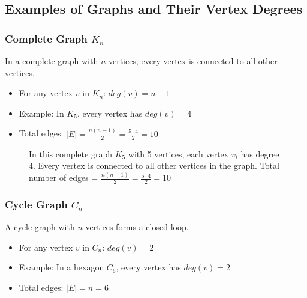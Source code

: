 \documentclass{article}
\theoremstyle{definition}
\def\deg{deg}%
\begin{document}
\subsection{Examples of Graphs and Their Vertex Degrees}

\subsubsection{Complete Graph $K_n$}
In a complete graph with $n$ vertices, every vertex is connected to all other vertices.
\begin{itemize}
    \item For any vertex $v$ in $K_n$: $\deg(v) = n-1$
    \item Example: In $K_5$, every vertex has $\deg(v) = 4$
    \item Total edges: $|E| = \frac{n(n-1)}{2} = \frac{5 \cdot 4}{2} = 10$
\end{itemize}

\begin{figure}[H]
\centering
{}
\caption{In this complete graph $K_5$ with 5 vertices, each vertex $v_i$ has degree 4. Every vertex is connected to all other vertices in the graph. Total number of edges = $\frac{n(n-1)}{2} = \frac{5 \cdot 4}{2} = 10$}
\end{figure}

\subsubsection{Cycle Graph $C_n$}
A cycle graph with $n$ vertices forms a closed loop.
\begin{itemize}
    \item For any vertex $v$ in $C_n$: $\deg(v) = 2$
    \item Example: In a hexagon $C_6$, every vertex has $\deg(v) = 2$
    \item Total edges: $|E| = n = 6$
\end{itemize}
\end{document}
